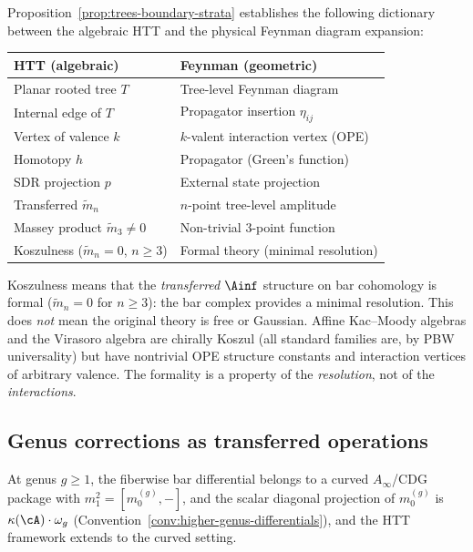 \begin{remark}
\label{rem:feynman-htt}
Proposition~\ref{prop:trees-boundary-strata} establishes the following
dictionary between the algebraic HTT and the physical Feynman diagram
expansion:

\medskip
\begin{center}
\renewcommand{\arraystretch}{1.15}
\begin{tabular}{@{} l @{\;\;$\longleftrightarrow$\;\;} l @{}}
\toprule
\textbf{HTT (algebraic)} & \textbf{Feynman (geometric)} \\
\midrule
Planar rooted tree $T$ & Tree-level Feynman diagram \\
Internal edge of $T$ & Propagator insertion $\eta_{ij}$ \\
Vertex of valence $k$ & $k$-valent interaction vertex (OPE) \\
Homotopy $h$ & Propagator (Green's function) \\
SDR projection $p$ & External state projection \\
Transferred $\tilde{m}_n$ & $n$-point tree-level amplitude \\
Massey product $\tilde{m}_3 \neq 0$ & Non-trivial 3-point function \\
Koszulness ($\tilde{m}_n = 0$, $n \geq 3$) & Formal theory (minimal resolution) \\
\bottomrule
\end{tabular}
\end{center}

\medskip
\noindent
Koszulness means that the \emph{transferred} $\Ainf$ structure on
bar cohomology is formal ($\tilde{m}_n = 0$ for $n \geq 3$): the
bar complex provides a minimal resolution. This does \emph{not}
mean the original theory is free or Gaussian. Affine Kac--Moody
algebras and the Virasoro algebra are chirally Koszul (all standard
families are, by PBW universality) but have nontrivial OPE structure
constants and interaction vertices of arbitrary valence. The
formality is a property of the \emph{resolution}, not of the
\emph{interactions}.
\end{remark}

\subsection{Genus corrections as transferred operations}
\label{subsec:genus-corrections-htt}

At genus $g \geq 1$, the fiberwise bar differential belongs to a
curved $A_\infty$/CDG package with $m_1^2=[m_0^{(g)},-]$, and the
scalar diagonal projection of $m_0^{(g)}$ is
$\kappa(\cA) \cdot \omega_g$
(Convention~\ref{conv:higher-genus-differentials}), and the
HTT framework extends to the curved setting.

